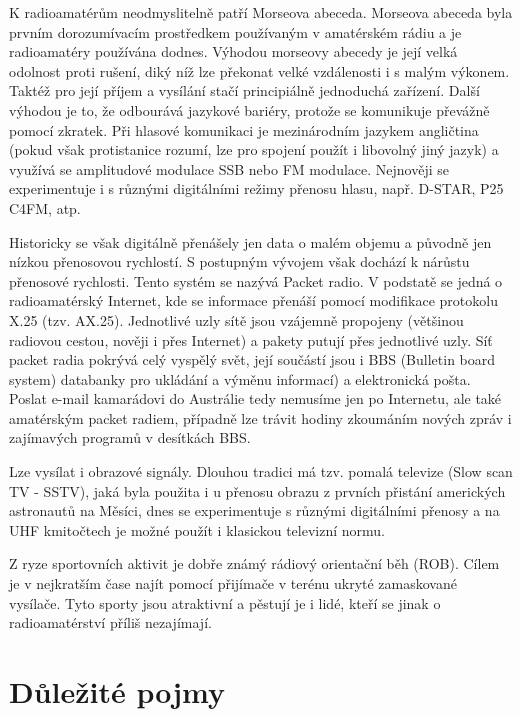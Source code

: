 K radioamatérům neodmyslitelně patří Morseova abeceda. Morseova abeceda byla prvním dorozumívacím prostředkem používaným v amatérském rádiu a je radioamatéry používána dodnes.
Výhodou morseovy %
abecedy je její velká odolnost proti rušení, diký níž lze překonat velké vzdálenosti i s malým
výkonem. Taktéž pro její příjem a vysílání stačí principiálně jednoduchá zařízení. Další výhodou je to, že odbourává jazykové bariéry, protože se komunikuje převážně pomocí zkratek. Při hlasové komunikaci
je mezinárodním jazykem angličtina (pokud však protistanice rozumí, lze pro
spojení použít i libovolný jiný jazyk) a využívá se amplitudové modulace SSB
nebo FM modulace. Nejnověji se experimentuje i s různými digitálními režimy
přenosu hlasu, např. D-STAR, %
P25 C4FM, atp.

Historicky se však digitálně přenášely jen data o malém objemu a původně jen nízkou
přenosovou rychlostí. S postupným vývojem však dochází k nárůstu přenosové
rychlosti. Tento systém se nazývá Packet radio. V podstatě se jedná o
radioamatérský Internet, kde se informace přenáší pomocí modifikace protokolu
X.25 (tzv. AX.25). %
Jednotlivé uzly sítě jsou vzájemně propojeny (většinou radiovou cestou, nověji i
přes Internet) a pakety putují přes jednotlivé uzly.
Síť packet radia pokrývá celý vyspělý svět, její součástí jsou i BBS (Bulletin
board system) databanky pro ukládání a výměnu informací) a
elektronická pošta. Poslat e-mail kamarádovi do Austrálie tedy nemusíme jen po Internetu,
ale také amatérským packet radiem, případně lze trávit hodiny zkoumáním nových zpráv i
zajímavých programů v desítkách BBS.

Lze vysílat i obrazové signály. Dlouhou tradici má tzv. pomalá televize (Slow
    scan TV - SSTV),
jaká byla použita i u přenosu obrazu z prvních přistání amerických astronautů na Měsíci,
dnes se experimentuje s různými digitálními přenosy a na UHF kmitočtech je možné
použít i klasickou televizní normu.

Z ryze sportovních aktivit je dobře známý rádiový
orientační běh (ROB). Cílem je v nejkratším čase najít pomocí
přijímače v terénu ukryté zamaskované vysílače. 
Tyto sporty jsou atraktivní a pěstují je i lidé, kteří se jinak o radioamatérství příliš nezajímají.

\section{Důležité pojmy}
\label{radioamateri_pojmy}

